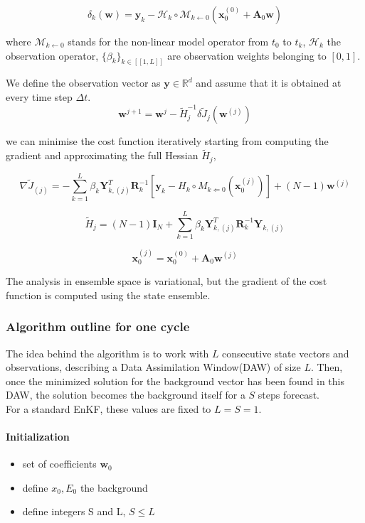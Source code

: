\documentclass[a4,12pt]{article}
\numberwithin{equation}{section}
\begin{document}
$$\delta_{k}(\textbf{w}) = \textbf{y}_{k} - \mathcal{H}_{k}\circ \mathcal{M}_{k\leftarrow 0}(\textbf{x}_{0}^{(0)} + \textbf{A}_{0}\textbf{w})$$

where $\mathcal{M}_{k\leftarrow 0}$ stands for the non-linear model operator from $t_{0}$ to $t_{k}$, $\mathcal{H}_{k}$ the observation operator, $\{\beta_k\}_{k \in [\![1,L]\!]}$ are observation weights belonging to $[0,1]$. 

We define the observation vector as $\textbf{y} \in \mathbb{R}^d$ and assume that it is obtained at every time step $\Delta t$. \\

$$\textbf{w}^{j+1} = \textbf{w}^{j} - \tilde{H}_{j}^{-1} \delta \tilde{J}_{j}(\textbf{w}^{(j)})$$

we can minimise the cost function iteratively starting from computing the gradient and approximating the full Hessian $\tilde{H}_{j}$,

$$\nabla \tilde{J}_{(j)} = -\sum_{k=1}^{L}\beta_{k}\textbf{Y}_{k,(j)}^{T}\textbf{R}_{k}^{-1}[\textbf{y}_{k} - H_{k}\circ M_{k\Leftarrow 0}(\textbf{x}_{0}^{(j)})] + (N-1)\textbf{w}^{(j)}$$

$$\tilde{H}_{j}=(N-1)\textbf{I}_{N}+\sum_{k=1}^{L} \beta_{k} \textbf{Y}_{k,(j)}^{T}\textbf{R}^{-1}_{k} \textbf{Y}_{k,(j)} $$

$$\textbf{x}_{0}^{(j)} = \textbf{x}_{0}^{(0)} + \textbf{A}_{0}\textbf{w}^{(j)}$$

The analysis in ensemble space is variational, but the gradient of the cost function is computed using the state ensemble.
\subsubsection{Algorithm outline for one cycle}
The idea behind the algorithm is to work with $L$ consecutive state vectors and observations, describing a Data Assimilation Window(DAW) of size $L$. Then, once the minimized solution for the background vector has been found in this DAW, the solution becomes the background itself for a $S$ steps forecast. \\
For a standard EnKF, these values are fixed to $L = S = 1$. \\

\paragraph{Initialization}
\begin{itemize}
\item set of coefficients $\textbf{w}_0$
\item define $x_0, E_0$ the background
\item define integers S and L, $S \le L$
\end{itemize}
\end{document}
